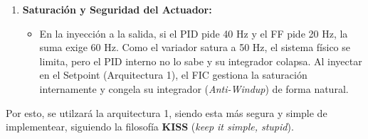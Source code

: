 \begin{enumerate}
    \item \textbf{Saturación y Seguridad del Actuador:}
    \begin{itemize}
        \item En la inyección a la salida, si el PID pide 40 Hz y el FF pide 20 Hz, la suma exige 60 Hz. Como el variador satura a 50 Hz, el sistema físico se limita, pero el PID interno no lo sabe y su integrador colapsa. Al inyectar en el Setpoint (Arquitectura 1), el FIC gestiona la saturación internamente y congela su integrador (\textit{Anti-Windup}) de forma natural.
    \end{itemize}
\end{enumerate}

Por esto, se utilzará la arquitectura 1, siendo esta más segura y simple de implementear, siguiendo la filosofía \textbf{KISS} (\textit{keep it simple, stupid}).

\clearpage
